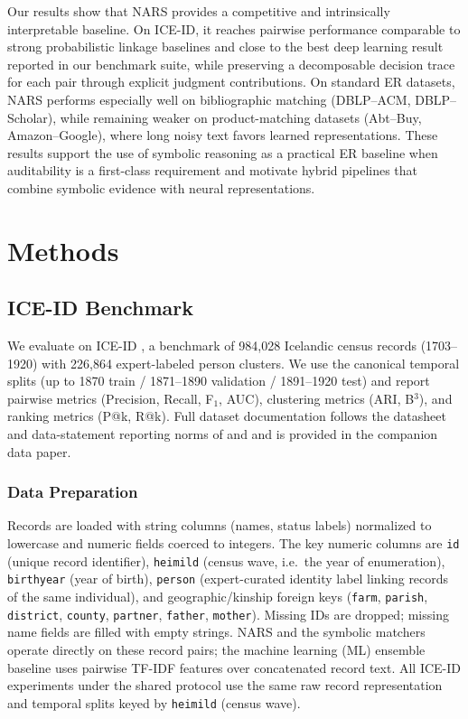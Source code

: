 \documentclass{article}
\begin{document}
Our results show that NARS provides a competitive and intrinsically interpretable baseline. On ICE-ID, it reaches pairwise performance comparable to strong probabilistic linkage baselines and close to the best deep learning result reported in our benchmark suite, while preserving a decomposable decision trace for each pair through explicit judgment contributions. On standard ER datasets, NARS performs especially well on bibliographic matching (DBLP--ACM, DBLP--Scholar), while remaining weaker on product-matching datasets (Abt--Buy, Amazon--Google), where long noisy text favors learned representations. These results support the use of symbolic reasoning as a practical ER baseline when auditability is a first-class requirement and motivate hybrid pipelines that combine symbolic evidence with neural representations.


\section{Methods}
\label{sec:methods}

\subsection{ICE-ID Benchmark}
We evaluate on ICE-ID \cite{iceid2024}, a benchmark of 984,028 Icelandic census records (1703--1920) with 226,864 expert-labeled person clusters. We use the canonical temporal splits (up to 1870 train / 1871--1890 validation / 1891--1920 test) and report pairwise metrics (Precision, Recall, F$_1$, AUC), clustering metrics (ARI, B$^3$), and ranking metrics (P@k, R@k). Full dataset documentation follows the datasheet and data-statement reporting norms of \citet{gebru2021datasheets} and \citet{Bender2018DataSF} and is provided in the companion data paper.

\subsubsection{Data Preparation}
Records are loaded with string columns (names, status labels) normalized to lowercase and numeric fields coerced to integers.
The key numeric columns are
\texttt{id} (unique record identifier),
\texttt{heimild} (census wave, i.e.\ the year of enumeration),
\texttt{birthyear} (year of birth),
\texttt{person} (expert-curated identity label linking records of the same individual),
and geographic/kinship foreign keys (\texttt{farm}, \texttt{parish}, \texttt{district}, \texttt{county}, \texttt{partner}, \texttt{father}, \texttt{mother}).
Missing IDs are dropped; missing name fields are filled with empty strings. NARS and the symbolic matchers operate directly on these record pairs; the machine learning (ML) ensemble baseline uses pairwise TF-IDF features over concatenated record text. All ICE-ID experiments under the shared protocol use the same raw record representation and temporal splits keyed by \texttt{heimild} (census wave).
\end{document}
